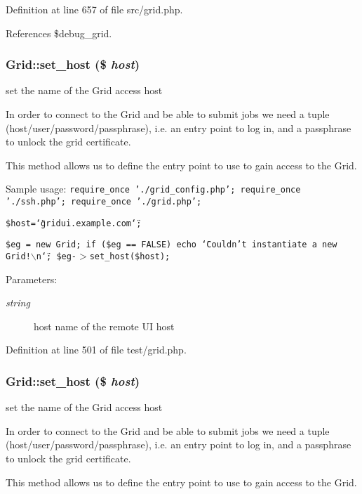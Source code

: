 Definition at line 657 of file src/grid.php.

References \$debug\_\-grid.
\subsubsection{\setlength{\rightskip}{0pt plus 5cm}Grid::set\_\-host (\$ {\em host})}\label{classGrid_a29}


set the name of the Grid access host 

In order to connect to the Grid and be able to submit jobs we need a tuple (host/user/password/passphrase), i.e. an entry point to log in, and a passphrase to unlock the grid certificate.

This method allows us to define the entry point to use to gain access to the Grid.

Sample usage: {\tt  require\_\-once './grid\_\-config.php'; require\_\-once './ssh.php'; require\_\-once './grid.php';}

{\tt  \$host=\char`\"{}gridui.example.com\char`\"{};}

{\tt  \$eg = new Grid; if (\$eg == FALSE) echo \char`\"{}Couldn't instantiate a new Grid!$\backslash$n\char`\"{}; \$eg-$>$set\_\-host(\$host); }

\begin{Desc}
\item[Parameters:]
\begin{description}
\item[{\em string}]host name of the remote UI host \end{description}
\end{Desc}


Definition at line 501 of file test/grid.php.
\subsubsection{\setlength{\rightskip}{0pt plus 5cm}Grid::set\_\-host (\$ {\em host})}\label{classGrid_a3}


set the name of the Grid access host 

In order to connect to the Grid and be able to submit jobs we need a tuple (host/user/password/passphrase), i.e. an entry point to log in, and a passphrase to unlock the grid certificate.

This method allows us to define the entry point to use to gain access to the Grid.

